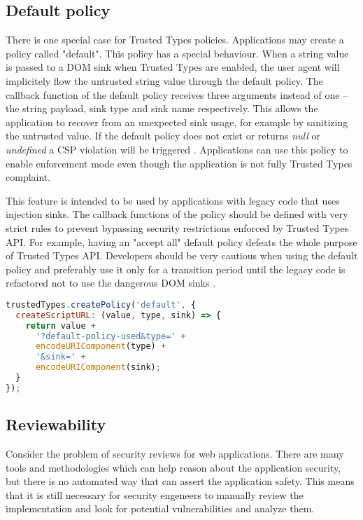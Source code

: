 \subsection{Default policy}

There is one special case for Trusted Types policies. Applications may create a policy called
"default". This policy has a special behaviour. When a string value is passed to a DOM sink when
Trusted Types are enabled, the user agent will implicitely flow the untrusted string value through
the default policy. The callback function of the default policy receives three arguments instead of
one -- the string payload, sink type and sink name respectively. This allows the application to
recover from an unexpected sink usage, for example by sanitizing the untrusted value. If the default
policy does not exist or returns \textit{null} or \textit{undefined} a CSP violation will be
triggered \cite{tt_spec:default_policy}. Applications can use this policy to enable enforcement mode
even though the application is not fully Trusted Types complaint.

This feature is intended to be used by applications with legacy code that uses injection sinks. The
callback functions of the policy should be defined with very strict rules to prevent bypassing
security restrictions enforced by Trusted Types API. For example, having an "accept all" default
policy defeats the whole purpose of Trusted Types API. Developers should be very cautious when using
the default policy and preferably use it only for a transition period until the legacy code is
refactored not to use the dangerous DOM sinks \cite{tt_spec:default_policy}.

\bigskip
\begin{lstlisting}[language=JavaScript, caption=Creating a default policy \cite{tt_spec:default_policy}]
trustedTypes.createPolicy('default', {
  createScriptURL: (value, type, sink) => {
    return value +
      '?default-policy-used&type=' +
      encodeURIComponent(type) +
      '&sink=' +
      encodeURIComponent(sink);
  }
});
\end{lstlisting}

\subsection{Reviewability}

Consider the problem of security reviews for web applications. There are many tools and methodologies
which can help reason about the application security, but there is no automated way that can assert
the application safety. This means that it is still necessary for security engeneers to manually
review the implementation and look for potential vulnerabilities and analyze them.

